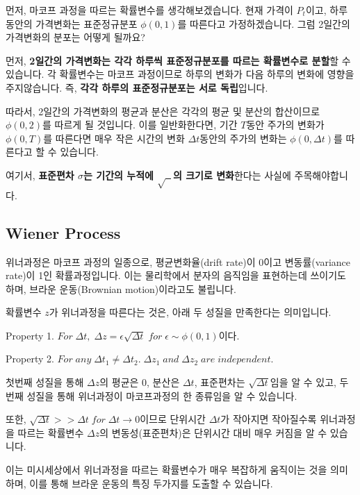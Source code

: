 \documentclass[
  letterpaper,
  DIV=11,
  numbers=noendperiod]{scrreprt}
\begin{document}

먼저, 마코프 과정을 따르는 확률변수를 생각해보겠습니다. 현재 가격이
\(P_t\)이고, 하루동안의 가격변화는 표준정규분포 \(\phi(0,1)\)를 따른다고
가정하겠습니다. 그럼 2일간의 가격변화의 분포는 어떻게 될까요?

먼저, \textbf{2일간의 가격변화는 각각 하루씩 표준정규분포를 따르는
확률변수로 분할}할 수 있습니다. 각 확률변수는 마코프 과정이므로 하루의
변화가 다음 하루의 변화에 영향을 주지않습니다. 즉, \textbf{각각 하루의
표준정규분포는 서로 독립}입니다.

따라서, 2일간의 가격변화의 평균과 분산은 각각의 평균 및 분산의
합산이므로 \(\phi(0,2)\)를 따르게 될 것입니다. 이를 일반화한다면, 기간
\(T\)동안 주가의 변화가 \(\phi(0,T)\)를 따른다면 매우 작은 시간의 변화
\(\Delta t\)동안의 주가의 변화는 \(\phi(0,\Delta t)\)를 따른다고 할 수
있습니다.

여기서, \textbf{표준편차 \(\sigma\)는 기간의 누적에 \(\sqrt{\;\;}\)의
크기로 변화}한다는 사실에 주목해야합니다.

\subsection*{Wiener Process}\label{wiener-process}

위너과정은 마코프 과정의 일종으로, 평균변화율(drift rate)이 0이고
변동률(variance rate)이 1인 확률과정입니다. 이는 물리학에서 분자의
음직임을 표현하는데 쓰이기도 하며, 브라운 운동(Brownian motion)이라고도
불립니다.

확률변수 \(z\)가 위너과정을 따른다는 것은, 아래 두 성질을 만족한다는
의미입니다.

Property 1.
\(For\;\Delta t,\;\Delta z=\epsilon\sqrt{\Delta t}\;for\;\epsilon\sim\phi(0,1)\)이다.

Property 2.
\(For\;any\;\Delta t_1\neq\Delta t_2.\;\Delta z_1\;and\;\Delta z_2\;are\;independent.\)

첫번째 성질을 통해 \(\Delta z\)의 평균은 0, 분산은 \(\Delta t\),
표준편차는 \(\sqrt{\Delta t}\)임을 알 수 있고, 두번째 성질을 통해
위너과정이 마코프과정의 한 종류임을 알 수 있습니다.

또한, \(\sqrt{\Delta t}>>\Delta t\;for\;\Delta t\rightarrow0\)이므로
단위시간 \(\Delta t\)가 작아지면 작아질수록 위너과정을 따르는 확률변수
\(\Delta z\)의 변동성(표준편차)은 단위시간 대비 매우 커짐을 알 수
있습니다.

이는 미시세상에서 위너과정을 따르는 확률변수가 매우 복잡하게 움직이는
것을 의미하며, 이를 통해 브라운 운동의 특징 두가지를 도출할 수 있습니다.
\end{document}
